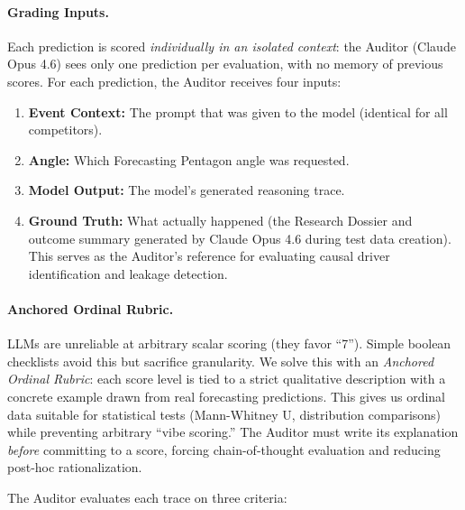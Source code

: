 \documentclass[11pt,a4paper]{article}
\begin{document}
\paragraph{Grading Inputs.}
Each prediction is scored \textit{individually in an isolated context}: the Auditor (Claude Opus 4.6) sees only one prediction per evaluation, with no memory of previous scores. For each prediction, the Auditor receives four inputs:
\begin{enumerate}
    \item \textbf{Event Context:} The prompt that was given to the model (identical for all competitors).
    \item \textbf{Angle:} Which Forecasting Pentagon angle was requested.
    \item \textbf{Model Output:} The model's generated reasoning trace.
    \item \textbf{Ground Truth:} What actually happened (the Research Dossier and outcome summary generated by Claude Opus 4.6 during test data creation). This serves as the Auditor's reference for evaluating causal driver identification and leakage detection.
\end{enumerate}

\paragraph{Anchored Ordinal Rubric.}
LLMs are unreliable at arbitrary scalar scoring \cite{zheng2023judging} (they favor ``7''). Simple boolean checklists avoid this but sacrifice granularity. We solve this with an \textit{Anchored Ordinal Rubric}: each score level is tied to a strict qualitative description with a concrete example drawn from real forecasting predictions. This gives us ordinal data suitable for statistical tests (Mann-Whitney U, distribution comparisons) while preventing arbitrary ``vibe scoring.'' The Auditor must write its explanation \textit{before} committing to a score, forcing chain-of-thought evaluation and reducing post-hoc rationalization.

The Auditor evaluates each trace on three criteria:
\end{document}

